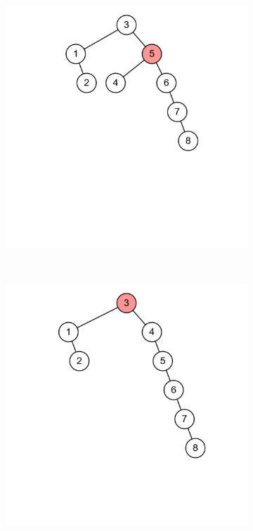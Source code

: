\documentclass[11pt,a4paper]{article}
\begin{document}
\begin{loesung}
\begin{enumerate}
\begin{figure}[h!]
\begin{subfigure}[b]{0.23\textwidth}
            \end{subfigure}
            \begin{subfigure}[b]{0.23\textwidth}
                \centering
                \includegraphics[width=\textwidth]{img/1b/4}
            \end{subfigure}
            \\
            \begin{subfigure}[b]{0.23\textwidth}
                \centering
                \includegraphics[width=\textwidth]{img/1b/5}

\end{subfigure}
\end{figure}
\end{enumerate}
\end{loesung}
\end{document}
